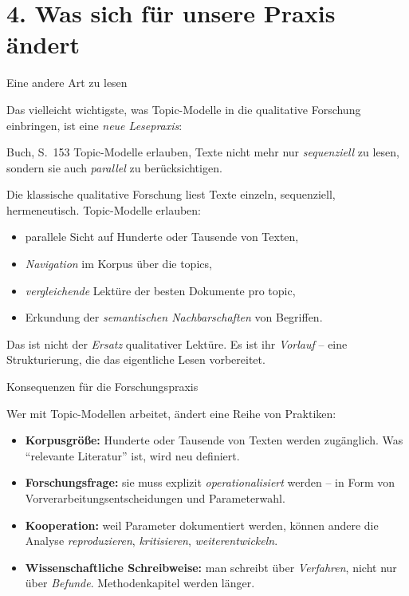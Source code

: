 \documentclass[aspectratio=169,11pt]{beamer}
\let\oldemph\emph
\renewcommand{\emph}[1]{{\color{solCyan}\oldemph{#1}}}
\let\oldtextbf\textbf
\renewcommand{\textbf}[1]{{\color{solBase3}\oldtextbf{#1}}}
\begin{document}
\section{4. Was sich für unsere Praxis ändert}

\begin{frame}{Eine andere Art zu lesen}

  Das vielleicht wichtigste, was Topic-Modelle in die qualitative
  Forschung einbringen, ist eine \emph{neue Lesepraxis}:

  \vfill
  \begin{block}{Buch, S.~153}
    Topic-Modelle erlauben, Texte nicht mehr nur \emph{sequenziell}
    zu lesen, sondern sie auch \emph{parallel} zu berücksichtigen.
  \end{block}

  \vfill
  Die klassische qualitative Forschung liest Texte einzeln,
  sequenziell, hermeneutisch. Topic-Modelle erlauben:
  \begin{itemize}
    \item parallele Sicht auf Hunderte oder Tausende von Texten,
    \vfill
    \item \emph{Navigation} im Korpus über die topics,
    \vfill
    \item \emph{vergleichende} Lektüre der besten Dokumente pro topic,
    \vfill
    \item Erkundung der \emph{semantischen Nachbarschaften} von Begriffen.
  \end{itemize}

  \vfill
  Das ist nicht der \emph{Ersatz} qualitativer Lektüre. Es ist ihr
  \emph{Vorlauf} – eine Strukturierung, die das eigentliche
  Lesen vorbereitet.

\end{frame}

\begin{frame}{Konsequenzen für die Forschungspraxis}

  Wer mit Topic-Modellen arbeitet, ändert eine Reihe von Praktiken:

  \vfill
  \begin{itemize}
    \item \textbf{Korpusgröße:} Hunderte oder Tausende von Texten
          werden zugänglich. Was \enquote{relevante Literatur} ist,
          wird neu definiert.
    \vfill
    \item \textbf{Forschungsfrage:} sie muss explizit \emph{operationalisiert}
          werden – in Form von Vorverarbeitungsentscheidungen und
          Parameterwahl.
    \vfill
    \item \textbf{Kooperation:} weil Parameter dokumentiert werden,
          können andere die Analyse \emph{reproduzieren}, \emph{kritisieren},
          \emph{weiterentwickeln}.
    \vfill
    \item \textbf{Wissenschaftliche Schreibweise:} man schreibt über
          \emph{Verfahren}, nicht nur über \emph{Befunde}.
          Methodenkapitel werden länger.
  \end{itemize}

\end{frame}
\end{document}
